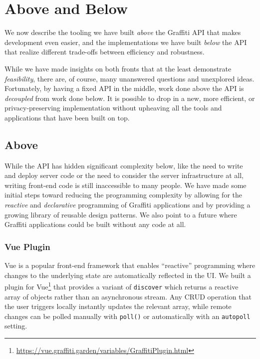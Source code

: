 \section{Above and Below}
\label{above-and-below}

We now describe the tooling we have built \emph{above}
the Graffiti API that makes development even easier, and
the implementations we have built \emph{below} the API
that realize different trade-offs between efficiency and
robustness.

While we have made insights on both fronts that at
the least demonstrate \emph{feasibility},
there are, of course,
many unanswered questions and unexplored ideas.
Fortunately, by having a fixed API in the middle, work done above the API
is \emph{decoupled} from work done below.
It is possible to drop in a new, more efficient, or privacy-preserving implementation
without upheaving all the tools and applications that have been built on top.

\subsection{Above}

While the API has hidden significant complexity below,
like the need to write and deploy server code or the need to
consider the server infrastructure at all,
writing front-end code is still inaccessible
to many people.
We have made some initial steps toward reducing the
programming complexity by allowing for the \emph{reactive} and
\emph{declarative} programming of Graffiti applications
and by providing a growing library of reusable design patterns.
We also point to a future where Graffiti applications could be built
without any code at all.

\subsubsection{Vue Plugin}

Vue is a popular front-end framework that enables ``reactive'' programming where
changes to the underlying state are automatically reflected in the UI.
We built a plugin for Vue\footnote{
  \url{https://vue.graffiti.garden/variables/GraffitiPlugin.html}
}
that provides a variant of
\texttt{discover} which returns a reactive array of objects rather than
an asynchronous stream.
Any CRUD operation that the user triggers locally instantly updates
the relevant array, while remote changes can be polled manually
with \texttt{poll()} or automatically
with an \texttt{autopoll} setting.

